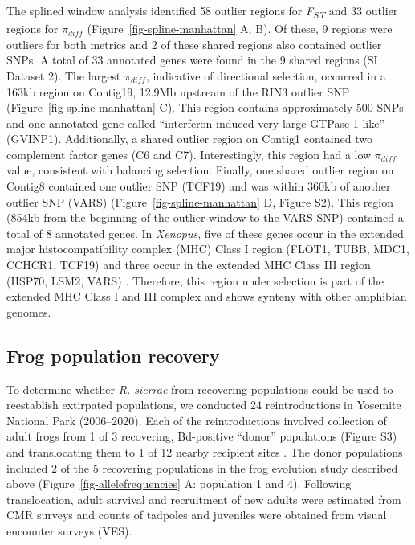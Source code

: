 \documentclass[9pt,twocolumn,twoside,lineno]{pnas-new}
\begin{document}
The splined window analysis identified 58 outlier regions for
\emph{F\textsubscript{ST}} and 33 outlier regions for \(\pi_{diff}\)
(Figure~\ref{fig-spline-manhattan} A, B). Of these, 9 regions were
outliers for both metrics and 2 of these shared regions also contained
outlier SNPs. A total of 33 annotated genes were found in the 9 shared
regions (SI Dataset 2). The largest \(\pi_{diff}\), indicative of
directional selection, occurred in a 163kb region on Contig19, 12.9Mb
upstream of the RIN3 outlier SNP (Figure~\ref{fig-spline-manhattan} C).
This region contains approximately 500 SNPs and one annotated gene
called ``interferon-induced very large GTPase 1-like'' (GVINP1).
Additionally, a shared outlier region on Contig1 contained two
complement factor genes (C6 and C7). Interestingly, this region had a
low \(\pi_{diff}\) value, consistent with balancing selection. Finally,
one shared outlier region on Contig8 contained one outlier SNP (TCF19)
and was within 360kb of another outlier SNP (VARS)
(Figure~\ref{fig-spline-manhattan} D, Figure S2).
This region (854kb from the beginning of the outlier window to the VARS
SNP) contained a total of 8 annotated genes. In \emph{Xenopus}, five of
these genes occur in the extended major histocompatibility complex (MHC)
Class I region (FLOT1, TUBB, MDC1, CCHCR1, TCF19) and three occur in the
extended MHC Class III region (HSP70, LSM2, VARS) \citep{ohta2006}.
Therefore, this region under selection is part of the extended MHC Class
I and III complex and shows synteny with other amphibian genomes.

\subsection*{Frog population recovery}

To determine whether \emph{R. sierrae} from recovering populations could
be used to reestablish extirpated populations, we conducted 24
reintroductions in Yosemite National Park (2006--2020). Each of the
reintroductions involved collection of adult frogs from 1 of 3
recovering, Bd-positive ``donor'' populations (Figure S3) and translocating them to 1 of 12 nearby recipient sites
\citep{seddon2014}. The donor populations included 2 of the 5 recovering
populations in the frog evolution study described above
(Figure~\ref{fig-allelefrequencies} A: population 1 and 4). Following
translocation, adult survival and recruitment of new adults were
estimated from CMR surveys and counts of tadpoles and juveniles were
obtained from visual encounter surveys (VES).
\end{document}
